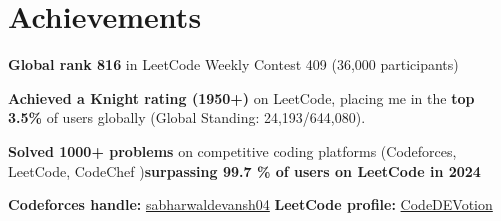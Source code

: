 \documentclass[letterpaper,11pt]{article}
\begin{document}
\section{\Large Achievements}
\begin{itemize}[leftmargin=0.15in, label={$\bullet$},itemsep=0pt]
    \item {\textbf{Global rank 816 }in LeetCode Weekly Contest 409 (36,000 participants)}\\
    \item {\textbf{Achieved a Knight rating (1950+)} on LeetCode, placing me in the\textbf{ top 3.5\%} of users globally (Global Standing: 24,193/644,080). 
    \item {\textbf{Solved 1000+ problems} on competitive coding platforms (Codeforces, LeetCode, CodeChef )\textbf{surpassing 99.7 \% of users on LeetCode in 2024} }
     \item {\textbf{Codeforces handle:} \href{https://codeforces.com/profile/sabharwaldevansh04}{sabharwaldevansh04}}
      {\textbf{  LeetCode profile:} \href{https://leetcode.com/u/CodeDEVotion/}{CodeDEVotion}}}

 \end{itemize}
\end{document}
